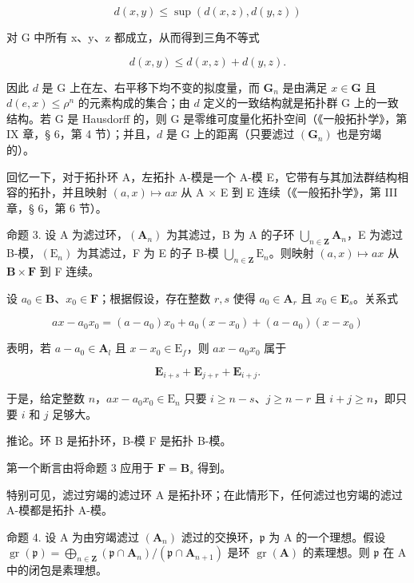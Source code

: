 \[
d (x, y) \leqslant \sup (d (x, z), d (y, z))\tag{15}
\]

对 G 中所有 x、y、z 都成立，从而得到三角不等式

\[
d (x, y) \leqslant d (x, z) + d (y, z).
\]

	因此 \(d\) 是 G 上在左、右平移下均不变的拟度量，而 \(\mathbf{G}_n\) 是由满足 \(x \in \mathbf{G}\) 且 \(d(e, x) \leqslant \rho^n\) 的元素构成的集合；由 \(d\) 定义的一致结构就是拓扑群 G 上的一致结构。若 G 是 Hausdorff 的，则 G 是零维可度量化拓扑空间（《一般拓扑学》，第 IX 章，§ 6，第 4 节）；并且，\(d\) 是 G 上的距离（只要滤过 \((\mathbf{G}_n)\) 也是穷竭的）。

回忆一下，对于拓扑环 A，左拓扑 A-模是一个 A-模 E，它带有与其加法群结构相容的拓扑，并且映射 \((a, x) \mapsto ax\) 从 A × E 到 E 连续（《一般拓扑学》，第 III 章，§ 6，第 6 节）。

命题 3. 设 A 为滤过环，\((\mathbf{A}_n)\) 为其滤过，B 为 A 的子环 \(\bigcup_{n\in \mathbf{Z}}\mathbf{A}_n\)，E 为滤过 B-模，\((\mathrm{E}_n)\) 为其滤过，F 为 E 的子 B-模 \(\bigcup_{n\in \mathbf{Z}}\mathrm{E}_n\)。则映射 \((a,x)\mapsto ax\) 从 \(\mathbf{B}\times \mathbf{F}\) 到 F 连续。

	设 \(a_0 \in \mathbf{B}\)、\(x_0 \in \mathbf{F}\)；根据假设，存在整数 \(r, s\) 使得 \(a_0 \in \mathbf{A}_r\) 且 \(x_0 \in \mathbf{E}_s\)。关系式

\[
a x - a _ {0} x _ {0} = (a - a _ {0}) x _ {0} + a _ {0} (x - x _ {0}) + (a - a _ {0}) (x - x _ {0})
\]

表明，若 \(a - a_0 \in \mathbf{A}_l\) 且 \(x - x_0 \in \mathrm{E}_f\)，则 \(ax - a_0x_0\) 属于

\[
\mathbf {E} _ {i + s} + \mathbf {E} _ {j + r} + \mathbf {E} _ {i + j}.
\]

	于是，给定整数 \(n\)，\(ax - a_0x_0 \in \mathrm{E}_n\) 只要 \(i \geqslant n - s\)、\(j \geqslant n - r\) 且 \(i + j \geqslant n\)，即只要 \(i\) 和 \(j\) 足够大。

推论。环 B 是拓扑环，B-模 F 是拓扑 B-模。

第一个断言由将命题 3 应用于 \(\mathbf{F} = \mathbf{B}_s\) 得到。

特别可见，滤过穷竭的滤过环 A 是拓扑环；在此情形下，任何滤过也穷竭的滤过 A-模都是拓扑 A-模。

	命题 4. 设 A 为由穷竭滤过 \((\mathbf{A}_n)\) 滤过的交换环，\(\mathfrak{p}\) 为 A 的一个理想。假设 \(\operatorname{gr}(\mathfrak{p}) = \bigoplus_{n \in \mathbf{Z}} (\mathfrak{p} \cap \mathbf{A}_n) / (\mathfrak{p} \cap \mathbf{A}_{n+1})\) 是环 \(\operatorname{gr}(\mathbf{A})\) 的素理想。则 \(\mathfrak{p}\) 在 A 中的闭包是素理想。

